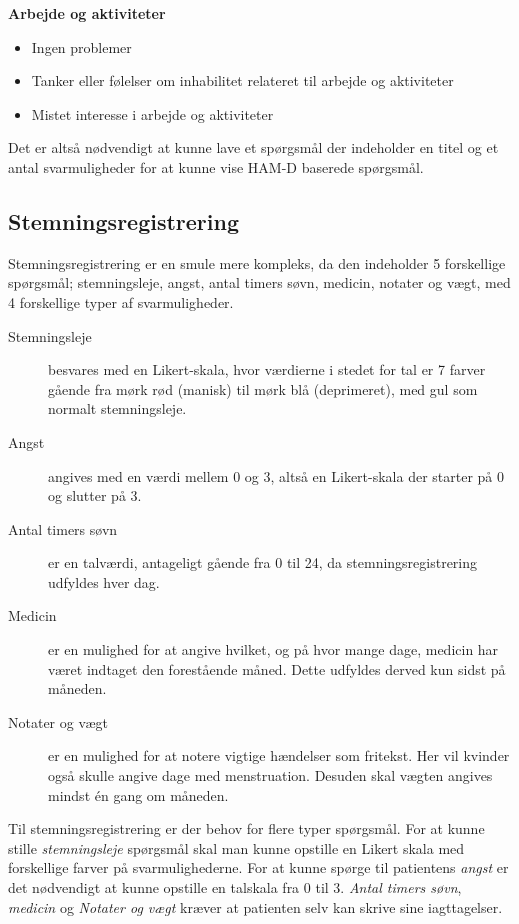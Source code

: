 \textbf{Arbejde og aktiviteter}
\begin{itemize}
\item Ingen problemer
\item Tanker eller følelser om inhabilitet relateret til arbejde og aktiviteter
\item Mistet interesse i arbejde og aktiviteter 
\end{itemize}

Det er altså nødvendigt at kunne lave et spørgsmål der indeholder en titel og et antal svarmuligheder for at kunne vise HAM-D baserede spørgsmål.

\subsection{Stemningsregistrering}\label{krav:stemningsregistrering}
Stemningsregistrering er en smule mere kompleks, da den indeholder 5 forskellige spørgsmål; stemningsleje, angst, antal timers søvn, medicin, notater og vægt, med 4 forskellige typer af svarmuligheder.

\begin{description}
\item[Stemningsleje] besvares med en Likert-skala, hvor værdierne i stedet for tal er 7 farver gående fra mørk rød (manisk) til mørk blå (deprimeret), med gul som normalt stemningsleje.

\item[Angst] angives med en værdi mellem 0 og 3, altså en Likert-skala der starter på 0 og slutter på 3.

\item[Antal timers søvn] er en talværdi, antageligt gående fra 0 til 24, da stemningsregistrering udfyldes hver dag.

\item[Medicin] er en mulighed for at angive hvilket, og på hvor mange dage, medicin har været indtaget den forestående måned.
Dette udfyldes derved kun sidst på måneden.

\item[Notater og vægt] er en mulighed for at notere vigtige hændelser som fritekst.
Her vil kvinder også skulle angive dage med menstruation.
Desuden skal vægten angives mindst én gang om måneden.
\end{description}

Til stemningsregistrering er der behov for flere typer spørgsmål.
For at kunne stille \emph{stemningsleje} spørgsmål skal man kunne opstille en Likert skala med forskellige farver på svarmulighederne.
For at kunne spørge til patientens \emph{angst} er det nødvendigt at kunne opstille en talskala fra 0 til 3.
\emph{Antal timers søvn}, \emph{medicin} og \emph{Notater og vægt} kræver at patienten selv kan skrive sine iagttagelser.

